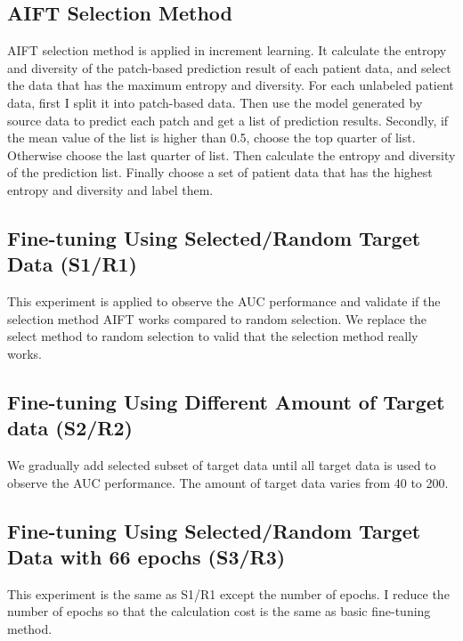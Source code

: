 \subsection{AIFT Selection Method}
AIFT selection method is applied in increment learning. It calculate the entropy and diversity of the patch-based prediction result of each patient data, and select the data that has the maximum entropy and diversity. For each unlabeled patient data, first I split it into patch-based data. Then use the model generated by source data to predict each patch and get a list of prediction results. Secondly, if the mean value of the list is higher than 0.5, choose the top quarter of list. Otherwise choose the last quarter of list. Then calculate the entropy and diversity of the prediction list. Finally choose a set of patient data that has the highest entropy and diversity and label them. 

\subsection{Fine-tuning Using Selected/Random Target Data (S1/R1)}
This experiment is applied to observe the AUC performance and validate if the selection method AIFT works compared to random selection. We replace the select method to random selection to valid that the selection method really works. 

\subsection{Fine-tuning Using Different Amount of Target data (S2/R2)}
We gradually add selected subset of target data until all target data is used to observe the AUC performance. The amount of target data varies from 40 to 200.

\subsection{Fine-tuning Using Selected/Random Target Data with 66 epochs (S3/R3)}
This experiment is the same as S1/R1 except the number of epochs. I reduce the number of epochs so that the calculation cost is the same as basic fine-tuning method. 